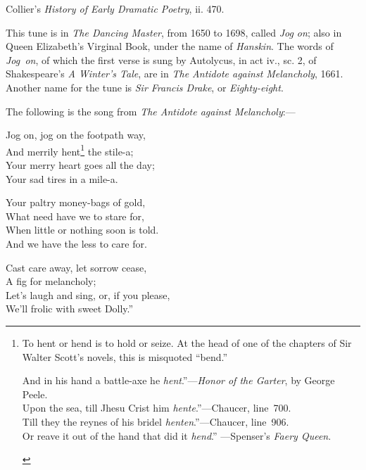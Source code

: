 {\footnotesize\hfill Collier’s \textit{History of Early Dramatic Poetry}, ii. 470.}


This tune is in \textit{The Dancing Master}, from 1650 to 1698, called \textit{Jog on}; also in
Queen Elizabeth’s Virginal Book, under the name of \textit{Hanskin}. The words of
\textit{Jog~on}, of which the first verse is sung by Autolycus, in act iv., sc. 2, of
Shakespeare’s \textit{A Winter’s Tale}, are in \textit{The Antidote against Melancholy}, 1661.
Another name for the tune is \textit{Sir Francis Drake}, or \textit{Eighty-eight}.

The following is the song from \textit{The Antidote against Melancholy}:—
\settowidth{\versewidth}{Your merry heart goes all the day}
\begin{dcverse}
\begin{altverse}
Jog on, jog on the footpath way,\\
And merrily hent\footnote{\textit{}
To hent or hend is to hold or seize. At the head of
one of the chapters of Sir Walter Scott’s novels, this is
misquoted “bend.”

\begin{fnverse}%
\vin{}And in his hand a battle-axe he \textit{hent}.”—\textit{Honor of the Garter}, by George Peele.\\
Upon the sea, till Jhesu Crist him \textit{hente}.”—Chaucer, line~700.\\
\vin{}Till they the reynes of his bridel \textit{henten}.”—Chaucer, line~906.\\
Or reave it out of the hand that did it \textit{hend}.” —Spenser’s \textit{Faery Queen}.
\end{fnverse}
}
 the stile-a;\\
Your merry heart goes all the day;\\
Your sad tires in a mile-a.

Your paltry money-bags of gold,\\
What need have we to stare for,\\
When little or nothing soon is told.\\
And we have the less to care for.
\end{altverse}
\end{dcverse}

\begin{scverse}
\begin{altverse}
Cast care away, let sorrow cease,\\
A fig for melancholy;\\
Let’s laugh and sing, or, if you please,\\
We’ll frolic with sweet Dolly.”
\end{altverse}
\end{scverse}

